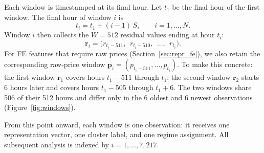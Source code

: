 \documentclass[12pt]{article}
\begin{document}
Each window is timestamped at its final hour.
Let $t_1$ be the final hour of the first window.
The final hour of window $i$ is
\begin{equation}
t_i = t_1 + (i-1)\,S,
\qquad
i=1,\ldots,N.
\label{eq:window_count}
\end{equation}
Window $i$ then collects the $W = 512$ residual values ending at hour $t_i$:
\begin{equation}
\mathbf{r}_i =
\bigl(r_{t_i-511},\;\, r_{t_i-510},\;\, \ldots,\;\, r_{t_i}\bigr).
\label{eq:window_vectors}
\end{equation}
For FE features that require raw prices (Section~\ref{sec:repr_fe}), we also retain the corresponding raw-price window $\mathbf{p}_i = (p_{t_i-511}, \ldots, p_{t_i})$.
To make this concrete: the first window $\mathbf{r}_1$ covers hours $t_1 - 511$ through $t_1$; the second window $\mathbf{r}_2$ starts 6 hours later and covers hours $t_1 - 505$ through $t_1 + 6$.
The two windows share 506 of their 512 hours and differ only in the 6 oldest and 6 newest observations (Figure~\ref{fig:windows}).

From this point onward, each window is one observation: it receives one representation vector, one cluster label, and one regime assignment.
All subsequent analysis is indexed by $i = 1, \ldots, 7{,}217$.
\end{document}
